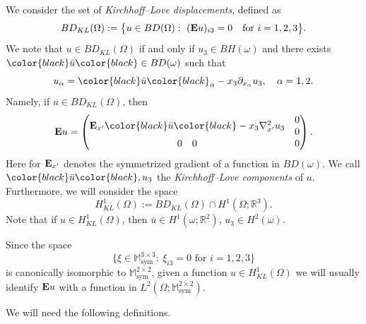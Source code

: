 \documentclass[reqno,10pt]{amsart}
\numberwithin{equation}{section}
\theoremstyle{remark}
\newcommand{\BLACK}{\color{black}}
\newcommand{\PINK}{\color{black}}
\newcommand{\M}{\mathbb{M}}
\newcommand{\R}{\mathbb{R}}
\DeclareMathOperator{\sym}{sym}
\newcommand{\E}{{\bf E}}
\newcommand{\D}{\nabla}
\begin{document}
\medskip
{} \nopagebreak

We consider the set of {\em Kirchhoff--Love displacements}, defined as
\begin{equation*}
	BD_{KL}(\Omega) := \big\{u \in BD(\Omega) : \ ({\E}u)_{i3}=0 \quad\text{for } i=1,2,3\big\}.
\end{equation*}
We note that $u \in BD_{KL}(\Omega)$ if and only if $u_3 \in BH(\omega)$ and there exists ${\PINK\bar{u}\BLACK} \in BD(\omega)$ such that 
\begin{equation*}
	u_{\alpha}={\PINK\bar{u}\BLACK}_{\alpha}-x_3\partial_{x_\alpha}u_3, \quad \alpha=1,2.
\end{equation*}
Namely, if $u \in BD_{KL}(\Omega)$, then 
\begin{equation*} \label{symmetric gradient of KL functions}
	{\E}u = \begin{pmatrix} \begin{matrix} {\E}_{x'}{\PINK\bar{u}\BLACK} - x_3 {\D}^2_{x'}u_3 \end{matrix} & \begin{matrix} 0 \\ 0 \end{matrix} \\ \begin{matrix} 0 & 0 \end{matrix} & 0 \end{pmatrix}.
\end{equation*}
Here for ${\E}_{x'}$ denotes the symmetrized gradient of a function in $BD(\omega)$. 
We call ${\PINK\bar{u}\BLACK}, u_3$ the {\em Kirchhoff--Love components} of $u$. 
Furthermore, we will consider the space
\begin{equation*}
	H^1_{KL}(\Omega) := BD_{KL}(\Omega) \cap H^1(\Omega;\R^3).
\end{equation*}
Note that if $u \in H^1_{KL}(\Omega)$, then $\bar{u} \in H^1(\omega;\R^2)$, $u_3 \in H^2(\omega)$.

Since the space
\begin{equation*}
	\big\{\xi\in \M^{3 \times 3}_{\sym}: \ \xi_{i3}=0 \text{ for }i=1,2,3\big\}
\end{equation*}
is canonically isomorphic to $\M^{2 \times 2}_{\sym}$, given a function $u \in H^1_{KL}(\Omega)$ we will usually identify ${\E}u$ with a function in $L^2(\Omega;\M^{2 \times 2}_{\sym})$. 

We will need the following definitions. 
\end{document}
